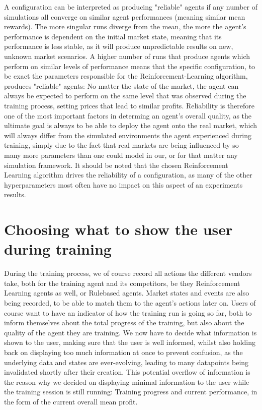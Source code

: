  A configuration can be interpreted as producing "reliable" agents if any number of simulations all converge on similar agent performances (meaning similar mean rewards). The more singular runs diverge from the mean, the more the agent's performance is dependent on the initial market state, meaning that its performance is less stable, as it will produce unpredictable results on new, unknown market scenarios. A higher number of runs that produce agents which perform on similar levels of performance means that the specific configuration, to be exact the parameters responsible for the Reinforcement-Learning algorithm, produces "reliable" agents: No matter the state of the market, the agent can always be expected to perform on the same level that was observed during the training process, setting prices that lead to similar profits. Reliability is therefore one of the most important factors in determing an agent's overall quality, as the ultimate goal is always to be able to deploy the agent onto the real market, which will always differ from the simulated environments the agent experienced during training, simply due to the fact that real markets are being influenced by so many more parameters than one could model in our, or for that matter any simulation framework. It should be noted that the chosen Reinforcement Learning algorithm drives the reliability of a configuration, as many of the other hyperparameters most often have no impact on this aspect of an experiments results.

\section{Choosing what to show the user during training}

During the training process, we of course record all actions the different vendors take, both for the training agent and its competitors, be they Reinforcement Learning agents as well, or Rulebased agents. Market states and events are also being recorded, to be able to match them to the agent's actions later on. Users of course want to have an indicator of how the training run is going so far, both to inform themselves about the total progress of the training, but also about the quality of the agent they are training. We now have to decide what information is shown to the user, making sure that the user is well informed, whilst also holding back on displaying too much information at once to prevent confusion, as the underlying data and states are ever-evolving, leading to many datapoints being invalidated shortly after their creation. This potential overflow of information is the reason why we decided on displaying minimal information to the user while the training session is still running: Training progress and current performance, in the form of the current overall mean profit.

